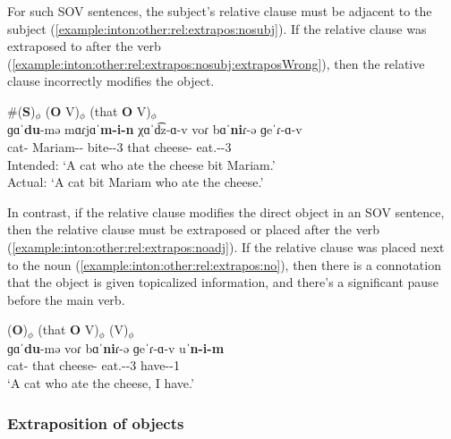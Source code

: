 For such SOV sentences, the subject's relative clause must be adjacent to the subject (\ref{example:inton:other:rel:extrapos:nosubj}). If the relative clause was extraposed to after the verb (\ref{example:inton:other:rel:extrapos:nosubj:extraposWrong}), then the relative clause incorrectly modifies the object.

\begin{exe}
	\ex \glll  \#({{\textbf{S}}})$_\phi$   (\textbf{O} V)$_\phi$  (that {\textbf{O}} V)$_\phi$\\
	{{ɡɑˈ\textbf{du}-mə}}  mɑɾjɑˈ\textbf{m-i-n} χɑˈd͡z-ɑ-v voɾ   {{bɑˈ\textbf{ni}ɾ-ə}} {ɡeˈɾ-ɑ-v} 
	\\
	cat-{\indf}  Mariam-{\dat}-{} bite-{\pst}-3{\sg} that   cheese-{} eat.{\aorperf}-{\pst}-3{\sg} 
	\\
	\trans Intended: `A cat who ate  the cheese bit Mariam.'\\
	Actual: `A cat bit Mariam who ate the cheese.' 
	\label{example:inton:other:rel:extrapos:nosubj:extraposWrong}
	\\
	
\end{exe}

In contrast, if the relative clause modifies the direct object in an SOV sentence, then the relative clause must be extraposed or placed after the verb (\ref{example:inton:other:rel:extrapos:noadj}). If the relative clause was placed next to the noun (\ref{example:inton:other:rel:extrapos:no}), then there is a connotation that the object is given  topicalized information, and there's a significant pause before the main verb.

\begin{exe}
	\ex   \glll  ({\textbf{O}})$_\phi$ (that {\textbf{O}} V)$_\phi$ (V)$_\phi$   \\
	{{ɡɑˈ\textbf{du}-mə}}  voɾ {{bɑˈ\textbf{ni}ɾ-ə}} {ɡeˈɾ-ɑ-v}   {uˈ\textbf{n-i-m}} 
	\\
	cat-{\indf} that cheese-{} eat.{\aorperf}-{\pst}-3{\sg}  have-{\thgloss}-1{\sg} 
	\\
	\trans `A   cat who ate the cheese, I have.'
	\label{example:inton:other:rel:extrapos:no}
	\\
\end{exe}

\subsubsection{Extraposition of objects}\label{section:intonation:other:extraposition:object}

